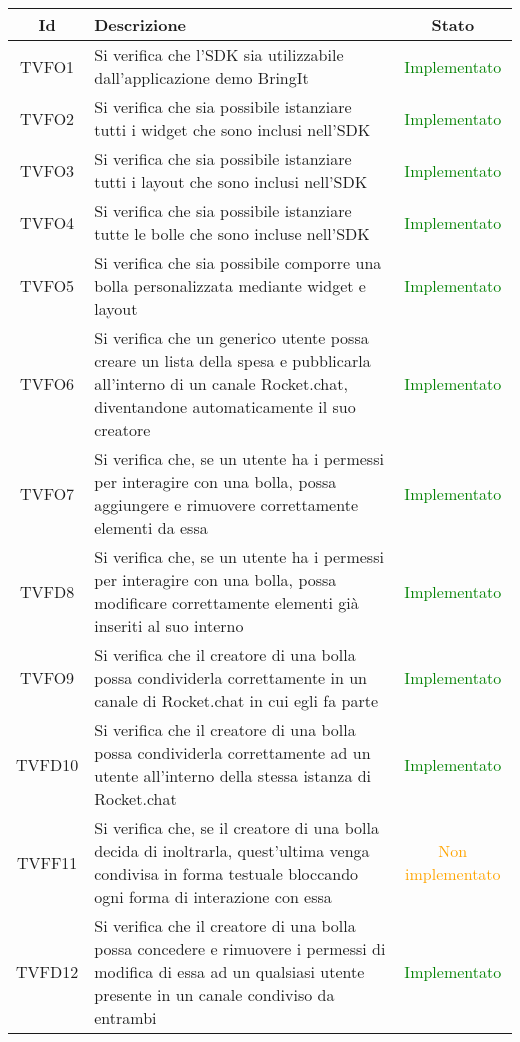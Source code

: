 \begin{center}
	\begin{longtable}{|c|>{\centering}m{10cm}|c|}\hline
		Id & Descrizione & Stato\\ \hline
		TVFO1 & Si verifica che l'SDK sia utilizzabile dall'applicazione demo BringIt & \textcolor{Green}{Implementato}\\ \hline
		TVFO2 & Si verifica che sia possibile istanziare tutti i widget che sono inclusi nell'SDK & \textcolor{Green}{Implementato}\\ \hline
		TVFO3 & Si verifica che sia possibile istanziare tutti i layout che sono inclusi nell'SDK & \textcolor{Green}{Implementato}\\ \hline
		TVFO4 & Si verifica che sia possibile istanziare tutte le bolle che sono incluse nell'SDK & \textcolor{Green}{Implementato}\\ \hline
		TVFO5 & Si verifica che sia possibile comporre una bolla personalizzata mediante widget e layout & \textcolor{Green}{Implementato}\\ \hline
		TVFO6 & Si verifica che un generico utente possa creare un lista della spesa e pubblicarla all'interno di un canale Rocket.chat, diventandone automaticamente il suo creatore & \textcolor{Green}{Implementato}\\ \hline
		TVFO7 & Si verifica che, se un utente ha i permessi per interagire con una bolla, possa aggiungere e rimuovere correttamente elementi da essa & \textcolor{Green}{Implementato}\\ \hline
		TVFD8 & Si verifica che, se un utente ha i permessi per interagire con una bolla, possa modificare correttamente elementi già inseriti al suo interno & \textcolor{Green}{Implementato}\\ \hline
		TVFO9 & Si verifica che il creatore di una bolla possa condividerla correttamente in un canale di Rocket.chat in cui egli fa parte & \textcolor{Green}{Implementato}\\ \hline
		TVFD10 & Si verifica che il creatore di una bolla possa condividerla correttamente ad un utente all'interno della stessa istanza di Rocket.chat & \textcolor{Green}{Implementato}\\ \hline
		TVFF11 & Si verifica che, se il creatore di una bolla decida di inoltrarla, quest'ultima venga condivisa in forma testuale bloccando ogni forma di interazione con essa & \textcolor{Orange}{Non implementato}\\ \hline
		TVFD12 & Si verifica che il creatore di una bolla possa concedere e rimuovere i permessi di modifica di essa ad un qualsiasi utente presente in un canale condiviso da entrambi & \textcolor{Green}{Implementato}\\ \hline

\end{longtable}
\end{center}

